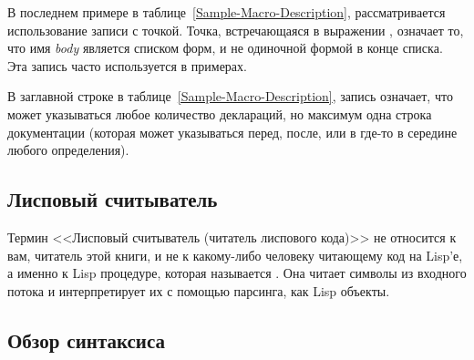 В последнем примере в таблице~\ref{Sample-Macro-Description}, рассматривается
использование записи с точкой. Точка, встречающаяся в выражении
, означает то, что имя \emph{body}
является списком форм, и не одиночной формой в конце списка. Эта запись 
часто используется в примерах.

В заглавной строке в таблице~\ref{Sample-Macro-Description}, запись \Mchoice{~}
означает, что может указываться любое количество деклараций, 
но максимум одна строка документации (которая может указываться перед, после,
или в где-то в середине любого определения).

\subsection{Лисповый считыватель}

Термин <<Лисповый считыватель (читатель лиспового кода)>> не относится к вам,
читатель этой книги, и не к какому-либо человеку читающему код на Lisp'е, а
именно к Lisp процедуре, которая называется . Она читает символы из
входного потока и интерпретирует их с помощью парсинга, как Lisp объекты.

\subsection{Обзор синтаксиса}

